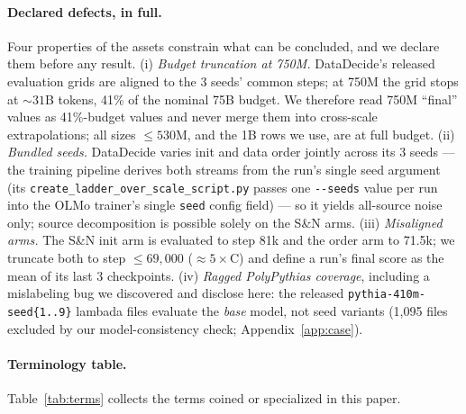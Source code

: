 \paragraph{Declared defects, in full.}
Four properties of the assets constrain what can be concluded, and we declare them before any
result. (i) \emph{Budget truncation at 750M.} DataDecide's released evaluation grids are aligned
to the 3 seeds' common steps; at 750M the grid stops at ${\sim}31$B tokens, 41\% of the nominal
75B budget. We therefore read 750M ``final'' values as 41\%-budget values and never merge them
into cross-scale extrapolations; all sizes $\le 530$M, and the 1B rows we use, are at full
budget. (ii) \emph{Bundled seeds.} DataDecide varies init and data order jointly across its 3
seeds --- the training pipeline derives both streams from the run's single seed argument (its
\texttt{create\_ladder\_over\_scale\_script.py} passes one \texttt{-{}-seeds} value per run into
the OLMo trainer's single \texttt{seed} config field) --- so it yields all-source noise only;
source decomposition is possible solely on the S\&N
arms. (iii) \emph{Misaligned arms.} The S\&N init arm is evaluated to step 81k and the order arm
to 71.5k; we truncate both to step $\le 69{,}000$ (${\approx}5\times$C) and define a run's final
score as the mean of its last 3 checkpoints. (iv) \emph{Ragged PolyPythias coverage}, including a
mislabeling bug we discovered and disclose here: the released \texttt{pythia-410m-seed\{1..9\}}
lambada files evaluate the \emph{base} model, not seed variants (1{,}095 files excluded by our
model-consistency check; Appendix~\ref{app:case}).

\paragraph{Terminology table.}
Table~\ref{tab:terms} collects the terms coined or specialized in this paper.

